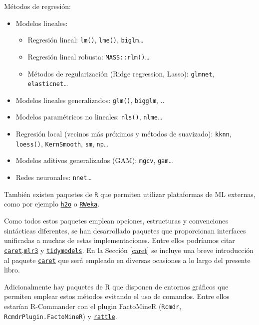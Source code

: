 \documentclass[
]{book}
\theoremstyle{break}
\theoremstyle{definition}
\theoremstyle{definition}
\theoremstyle{definition}
\theoremstyle{remark}
\begin{document}
Métodos de regresión:

\begin{itemize}
\item
  Modelos lineales:

  \begin{itemize}
  \item
    Regresión lineal: \texttt{lm()}, \texttt{lme()}, \texttt{biglm}\ldots{}
  \item
    Regresión lineal robusta: \texttt{MASS::rlm()}\ldots{}
  \item
    Métodos de regularización (Ridge regression, Lasso):
    \texttt{glmnet}, \texttt{elasticnet}\ldots{}
  \end{itemize}
\item
  Modelos lineales generalizados: \texttt{glm()}, \texttt{bigglm}, ..
\item
  Modelos paramétricos no lineales: \texttt{nls()}, \texttt{nlme}\ldots{}
\item
  Regresión local (vecinos más próximos y métodos de suavizado):
  \texttt{kknn}, \texttt{loess()}, \texttt{KernSmooth}, \texttt{sm}, \texttt{np}\ldots{}
\item
  Modelos aditivos generalizados (GAM): \texttt{mgcv}, \texttt{gam}\ldots{}
\item
  Redes neuronales: \texttt{nnet}\ldots{}
\end{itemize}

También existen paquetes de \texttt{R} que permiten utilizar plataformas de ML externas, como por ejemplo \href{https://github.com/h2oai/h2o-3/tree/master/h2o-r}{\texttt{h2o}} o \href{https://CRAN.R-project.org/package=RWeka}{\texttt{RWeka}}.

Como todos estos paquetes emplean opciones, estructuras y convenciones sintácticas diferentes, se han desarrollado paquetes que proporcionan interfaces unificadas a muchas de estas implementaciones.
Entre ellos podríamos citar \href{https://topepo.github.io/caret}{\texttt{caret}},\href{https://mlr3.mlr-org.com}{\texttt{mlr3}} y \href{https://www.tidymodels.org}{\texttt{tidymodels}}.
En la Sección \ref{caret} se incluye una breve introducción al paquete \href{https://topepo.github.io/caret}{\texttt{caret}} que será empleado en diversas ocasiones a lo largo del presente libro.

Adicionalmente hay paquetes de R que disponen de entornos gráficos que permiten emplear estos métodos evitando el uso de comandos.
Entre ellos estarían R-Commander con el plugin FactoMineR (\texttt{Rcmdr}, \texttt{RcmdrPlugin.FactoMineR}) y \href{https://rattle.togaware.com}{\texttt{rattle}}.
\end{document}
